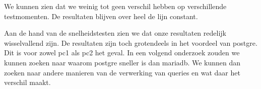 \documentclass[fleqn,10pt]{artikeltin}
\begin{document}
We kunnen zien dat we weinig tot geen verschil hebben op verschillende testmomenten. De resultaten blijven over heel de lijn constant.

 Aan de hand van de snelheidstesten zien we dat onze resultaten redelijk wisselvallend zijn. De resultaten zijn toch grotendeels in het voordeel van postgre. Dit is voor zowel pc1 als pc2 het geval. In een volgend onderzoek zouden we kunnen zoeken naar waarom postgre sneller is dan mariadb. We kunnen dan zoeken naar andere manieren van de verwerking van queries en wat daar het verschil maakt.

 


\printbibliography[heading=bibintoc]
\end{document}

